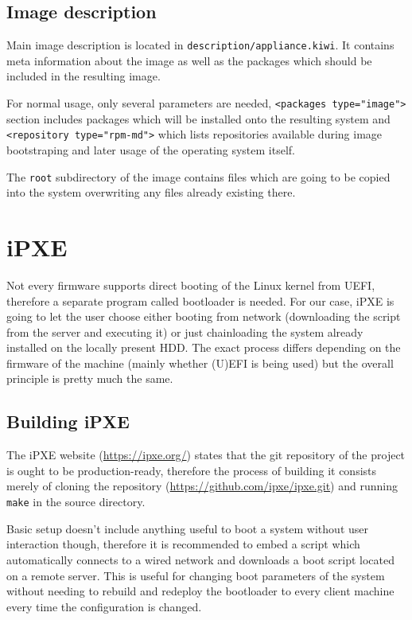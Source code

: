 \documentclass{article}
\begin{document}
\subsection{Image description}

Main image description is located in \verb|description/appliance.kiwi|. It contains meta information about the image as well as the packages which should be included in the resulting image.

For normal usage, only several parameters are needed, \verb|<packages type="image">| section includes packages which will be installed onto the resulting system and \verb|<repository type="rpm-md">| which lists repositories available during image bootstraping and later usage of the operating system itself.

The \verb|root| subdirectory of the image contains files which are going to be copied into the system overwriting any files already existing there. 

\section{iPXE}

Not every firmware supports direct booting of the Linux kernel from UEFI, therefore a separate program called bootloader is needed. For our case, iPXE is going to let the user choose either booting from network (downloading the script from the server and executing it) or just chainloading the system already installed on the locally present HDD. The exact process differs depending on the firmware of the machine (mainly whether (U)EFI is being used) but the overall principle is pretty much the same.

\subsection{Building iPXE}

The iPXE website (\url{https://ipxe.org/}) states that the git repository of the project is ought to be production-ready,
therefore the process of building it consists merely of cloning the repository (\url{https://github.com/ipxe/ipxe.git}) and running \verb|make| in the source directory.

Basic setup doesn't include anything useful to boot a system without user interaction though, therefore it is recommended to embed a script which automatically connects to a wired network and downloads a boot script located on a remote server.
This is useful for changing boot parameters of the system without needing to rebuild and redeploy the bootloader to every client machine every time the configuration is changed.
\end{document}
